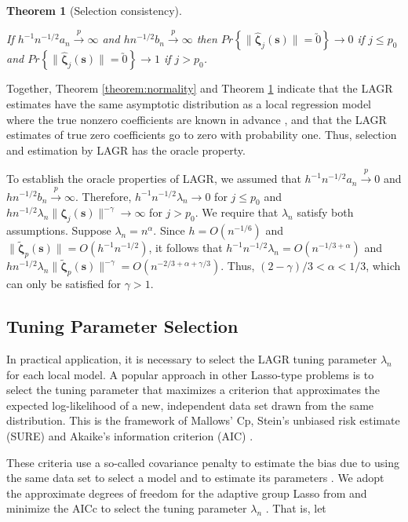 \documentclass[authoryear,review, 12pt]{elsarticle}
\newtheorem{thm}{Theorem}
\begin{document}
\begin{thm}[Selection consistency]
\label{theorem:selection}



If $h^{-1}n^{-1/2}a_{n}\xrightarrow{p}\infty$ and $hn^{-1/2}b_{n}\xrightarrow{p}\infty$
then $Pr\left\{ \|\hat{\bm{\zeta}}_{j}\left(\bm{s}\right)\|=\utilde{0}\right\} \to0$
if $j\le p_{0}$ and $Pr\left\{ \|\hat{\bm{\zeta}}_{j}\left(\bm{s}\right)\|=\utilde{0}\right\} \to1$
if $j>p_{0}$. 
\end{thm}
Together, Theorem \ref{theorem:normality} and Theorem \ref{theorem:selection}
indicate that the LAGR estimates have the same asymptotic distribution
as a local regression model where the true nonzero coefficients are
known in advance \citep{Sun-Yan-Zhang-Lu-2014}, and that the LAGR
estimates of true zero coefficients go to zero with probability one.
Thus, selection and estimation by LAGR has the oracle property.

To establish the oracle properties of LAGR, we assumed that $h^{-1}n^{-1/2}a_{n}\xrightarrow{p}0$
and $hn^{-1/2}b_{n}\xrightarrow{p}\infty$. Therefore, $h^{-1}n^{-1/2}\lambda_{n}\to0$
for $j\le p_{0}$ and $hn^{-1/2}\lambda_{n}\|\bm{\zeta}_{j}\left(\bm{s}\right)\|^{-\gamma}\to\infty$
for $j>p_{0}$. We require that $\lambda_{n}$ satisfy both assumptions.
Suppose $\lambda_{n}=n^{\alpha}$. Since $h=O\left(n^{-1/6}\right)$
and $\|\tilde{\bm{\zeta}}_{p}(\bm{s})\|=O\left(h^{-1}n^{-1/2}\right)$,
it follows that $h^{-1}n^{-1/2}\lambda_{n}=O\left(n^{-1/3+\alpha}\right)$
and $hn^{-1/2}\lambda_{n}\|\tilde{\bm{\zeta}}_{p}\left(\bm{s}\right)\|^{-\gamma}=O\left(n^{-2/3+\alpha+\gamma/3}\right)$.
Thus, $\left(2-\gamma\right)/3<\alpha<1/3$, which can only be satisfied
for $\gamma>1$.


\subsection{Tuning Parameter Selection}

In practical application, it is necessary to select the LAGR tuning
parameter $\lambda_{n}$ for each local model. A popular approach
in other Lasso-type problems is to select the tuning parameter that
maximizes a criterion that approximates the expected log-likelihood
of a new, independent data set drawn from the same distribution. This
is the framework of Mallows' Cp, Stein's unbiased risk estimate (SURE)
and Akaike's information criterion (AIC) \citep{Mallows-1973,Stein-1981,Akaike-1973}.

These criteria use a so-called covariance penalty to estimate the
bias due to using the same data set to select a model and to estimate
its parameters \citep{Efron:2004a}. We adopt the approximate degrees
of freedom for the adaptive group Lasso from \citet{Yuan-Lin-2006}
and minimize the AICc to select the tuning parameter $\lambda_{n}$
\citep{Hurvich-1998}. That is, let
\end{document}
